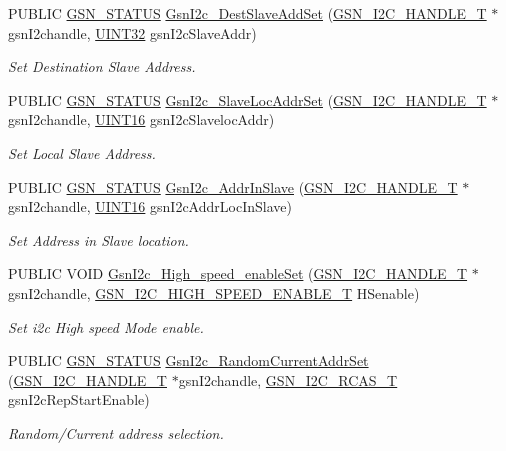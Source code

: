 \begin{DoxyCompactItemize}
\item 
PUBLIC \hyperlink{a00660_gada5951904ac6110b1fa95e51a9ddc217}{GSN\_\-STATUS} \hyperlink{a00649_ga863505feedae2f7a5958d5f80cbf24cb}{GsnI2c\_\-DestSlaveAddSet} (\hyperlink{a00100}{GSN\_\-I2C\_\-HANDLE\_\-T} $\ast$gsnI2chandle, \hyperlink{a00660_gae1e6edbbc26d6fbc71a90190d0266018}{UINT32} gsnI2cSlaveAddr)
\begin{DoxyCompactList}\small\item\em Set Destination Slave Address. \end{DoxyCompactList}\item 
PUBLIC \hyperlink{a00660_gada5951904ac6110b1fa95e51a9ddc217}{GSN\_\-STATUS} \hyperlink{a00649_gad36905265e175988b6f39b9724078929}{GsnI2c\_\-SlaveLocAddrSet} (\hyperlink{a00100}{GSN\_\-I2C\_\-HANDLE\_\-T} $\ast$gsnI2chandle, \hyperlink{a00660_ga09f1a1fb2293e33483cc8d44aefb1eb1}{UINT16} gsnI2cSlavelocAddr)
\begin{DoxyCompactList}\small\item\em Set Local Slave Address. \end{DoxyCompactList}\item 
PUBLIC \hyperlink{a00660_gada5951904ac6110b1fa95e51a9ddc217}{GSN\_\-STATUS} \hyperlink{a00649_ga30a24cb98453484c641cc68384a2c20a}{GsnI2c\_\-AddrInSlave} (\hyperlink{a00100}{GSN\_\-I2C\_\-HANDLE\_\-T} $\ast$gsnI2chandle, \hyperlink{a00660_ga09f1a1fb2293e33483cc8d44aefb1eb1}{UINT16} gsnI2cAddrLocInSlave)
\begin{DoxyCompactList}\small\item\em Set Address in Slave location. \end{DoxyCompactList}\item 
PUBLIC VOID \hyperlink{a00649_gaf3d84383c6018e61b76e8db674bb2fb5}{GsnI2c\_\-High\_\-speed\_\-enableSet} (\hyperlink{a00100}{GSN\_\-I2C\_\-HANDLE\_\-T} $\ast$gsnI2chandle, \hyperlink{a00649_ga78dfa46a936df5bba07b4ba66cdfca62}{GSN\_\-I2C\_\-HIGH\_\-SPEED\_\-ENABLE\_\-T} HSenable)
\begin{DoxyCompactList}\small\item\em Set i2c High speed Mode enable. \end{DoxyCompactList}\item 
PUBLIC \hyperlink{a00660_gada5951904ac6110b1fa95e51a9ddc217}{GSN\_\-STATUS} \hyperlink{a00649_ga323ceb5b782ad727f819bf1e110eb2d8}{GsnI2c\_\-RandomCurrentAddrSet} (\hyperlink{a00100}{GSN\_\-I2C\_\-HANDLE\_\-T} $\ast$gsnI2chandle, \hyperlink{a00649_ga3e0976c06462690937465a53a0c38cc4}{GSN\_\-I2C\_\-RCAS\_\-T} gsnI2cRepStartEnable)
\begin{DoxyCompactList}\small\item\em Random/Current address selection. \end{DoxyCompactList}\item 

\end{DoxyCompactItemize}
